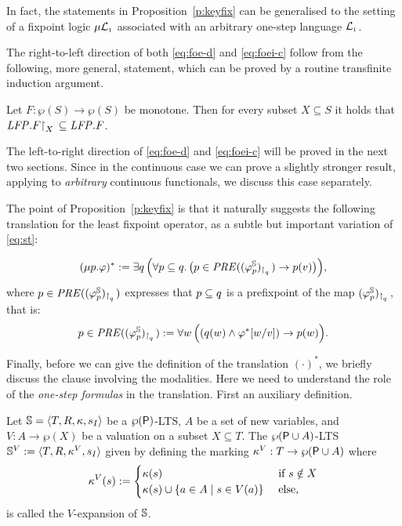 \begin{remark}
In fact, the statements in Proposition~\ref{p:keyfix} can be generalised to the
setting of a fixpoint logic $\mu\mathcal{L}_{\scriptscriptstyle 1}$ associated with an arbitrary one-step 
language $\mathcal{L}_{\scriptscriptstyle 1}$.
\end{remark}

The right-to-left direction of both \eqref{eq:foe-d} and \eqref{eq:foei-c} follow
from the following, more general, statement, which can be proved by a routine 
transfinite induction argument.

\begin{proposition}
\label{p:rstfix}
Let $F:  \wp(S)\to \wp(S)$ be monotone.
Then for every subset $X \subseteq S$ it holds that $\mathit{LFP}. F{\upharpoonright}_{X}\,\subseteq 
\mathit{LFP}.F$.
\end{proposition}

The left-to-right direction of \eqref{eq:foe-d} and \eqref{eq:foei-c} 
will be proved in the next two sections.
Since in the continuous case we can prove a slightly stronger result, applying
to \emph{arbitrary} continuous functionals, we discuss this case separately.

\newcommand{\PRE}{\mathit{PRE}}
The point of Proposition~\ref{p:keyfix} is that it naturally suggests the
following translation for the least fixpoint operator, as a subtle but important 
variation of \eqref{eq:st}:

\begin{equation}
\label{eq:trlmu}
(\mu p. \varphi)^{*} \df 
   \exists q\,\Big(\forall  p \sse q.\,
      \big(p \in \PRE((\varphi^{\model}_{p})_{\rst{q}}) \to p(v)\big)\Big),
\end{equation}
where $p \in \PRE((\varphi^{\model}_{p})_{\rst{q}})$ expresses that $p \subseteq q$ 
is a prefixpoint of the map $(\varphi^{\mathbb{S}}_{p})_{{\upharpoonright}_{q}\,}$, that is:
\[
p  \in \PRE((\varphi^{\model}_{p})_{\rst{q}}) \df
\forall w\, \Big(
( q(w) \land \varphi^{*}[w/v]) \to p(w)
\Big).
\]

Finally, before we can give the definition of the translation $(\cdot)^{*}$, we
briefly discuss the clause involving the modalities.
Here we need to understand the role of the \emph{one-step formulas} in the 
translation.
First an auxiliary definition.

\begin{definition}\label{def:exp}
Let $\mathbb{S} = \langle{T,R,\kappa, s_I}\rangle$ be a $\wp{(\mathsf{P})}$-LTS, $A$ be a set of new variables, and $V: A \to
\wp(X)$ be a valuation on a subset $X\subseteq T$. The $\wp{(\mathsf{P}\cup A)}$-LTS $\mathbb{S}^{V}:=\langle{T,R,\kappa^V, s_I}\rangle$ given by defining the marking $\kappa^V: T \to \wp{(\mathsf{P}\cup A)}$ where
\[\tscolors^V(s):= 
\begin{cases} \tscolors(s) & \text{ if } s \notin X \\
\tscolors(s) \cup \{ a \in A \mid s \in V(a)\}& \text{ else,}
\end{cases}\]
is called the $V$-expansion of $\mathbb{S}$.
\end{definition}

